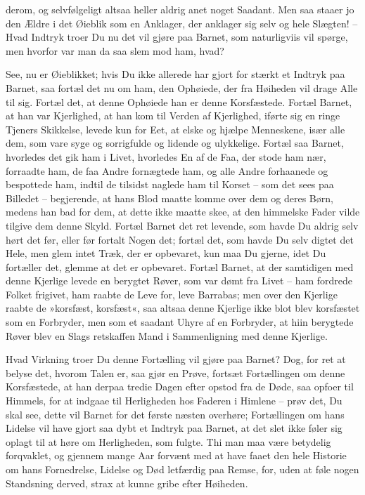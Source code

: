 \documentclass[12pt,a4paper]{article}
\begin{document}
derom, og selvfølgeligt altsaa heller aldrig anet noget Saadant. Men saa staaer jo den Ældre i det Øieblik som en Anklager, der anklager sig selv og hele Slægten! – Hvad Indtryk troer Du nu det vil gjøre paa Barnet, som naturligviis vil spørge, men hvorfor var man da saa slem mod ham, hvad?

See, nu er Øieblikket; hvis Du ikke allerede har gjort for stærkt et Indtryk paa Barnet, saa fortæl det nu om ham, den Ophøiede, der fra Høiheden vil drage Alle til sig. Fortæl det, at denne Ophøiede han er denne Korsfæstede. Fortæl Barnet, at han var Kjerlighed, at han kom til Verden af Kjerlighed, iførte sig en ringe Tjeners Skikkelse, levede kun for Eet, at elske og hjælpe Menneskene, især alle dem, som vare syge og sorrigfulde og lidende og ulykkelige. Fortæl saa Barnet, hvorledes det gik ham i Livet, hvorledes En af de Faa, der stode ham nær, forraadte ham, de faa Andre fornægtede ham, og alle Andre forhaanede og bespottede ham, indtil de tilsidst naglede ham til Korset – som det sees paa Billedet – begjerende, at hans Blod maatte komme over dem og deres Børn, medens han bad for dem, at dette ikke maatte skee, at den himmelske Fader vilde tilgive dem denne Skyld. Fortæl Barnet det ret levende, som havde Du aldrig selv hørt det før, eller før fortalt Nogen det; fortæl det, som havde Du selv digtet det Hele, men glem intet Træk, der er opbevaret, kun maa Du gjerne, idet Du fortæller det, glemme at det er opbevaret. Fortæl Barnet, at der samtidigen med denne Kjerlige levede en berygtet Røver, som var dømt fra Livet – ham fordrede Folket frigivet, ham raabte de Leve for, leve Barrabas; men over den Kjerlige raabte de »korsfæst, korsfæst«, saa altsaa denne Kjerlige ikke blot blev korsfæstet som en Forbryder, men som et saadant Uhyre af en Forbryder, at hiin berygtede Røver blev en Slags retskaffen Mand i Sammenligning med denne Kjerlige.

Hvad Virkning troer Du denne Fortælling vil gjøre paa Barnet? Dog, for ret at belyse det, hvorom Talen er, saa gjør en Prøve, fortsæt Fortællingen om denne Korsfæstede, at han derpaa tredie Dagen efter opstod fra de Døde, saa opfoer til Himmels, for at indgaae til Herligheden hos Faderen i Himlene – prøv det, Du skal see, dette vil Barnet for det første næsten overhøre; Fortællingen om hans Lidelse vil have gjort saa dybt et Indtryk paa Barnet, at det slet ikke føler sig oplagt til at høre om Herligheden, som fulgte. Thi man maa være betydelig forqvaklet, og gjennem mange Aar forvænt med at have faaet den hele Historie om hans Fornedrelse, Lidelse og Død letfærdig paa Remse, for, uden at føle nogen Standsning derved, strax at kunne gribe efter Høiheden.
\end{document}
